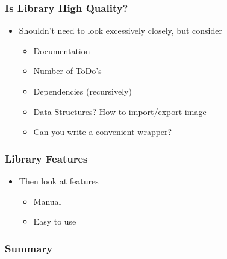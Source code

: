 \subsubsection{Is Library High Quality?}\label{is-library-high-quality}

\begin{itemize}
\itemsep1pt\parskip0pt
\item
  Shouldn't need to look excessively closely, but consider

  \begin{itemize}
  \itemsep1pt\parskip0pt
  \item
    Documentation
  \item
    Number of ToDo's
  \item
    Dependencies (recursively)
  \item
    Data Structures? How to import/export image
  \item
    Can you write a convenient wrapper?
  \end{itemize}
\end{itemize}

\subsubsection{Library Features}\label{library-features}

\begin{itemize}
\itemsep1pt\parskip0pt
\item
  Then look at features

  \begin{itemize}
  \itemsep1pt\parskip0pt
  \item
    Manual
  \item
    Easy to use
  \end{itemize}
\end{itemize}

\subsubsection{Summary}\label{summary}

